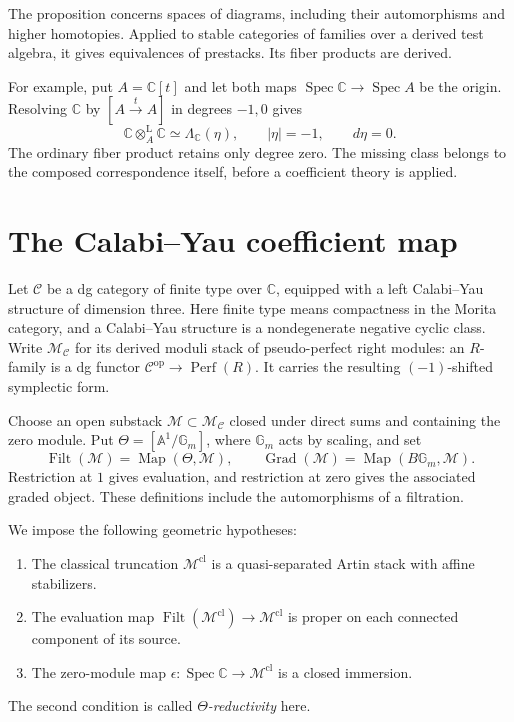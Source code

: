 The proposition concerns spaces of diagrams, including their
automorphisms and higher homotopies. Applied to stable categories
of families over a derived test algebra, it gives equivalences
of prestacks. Its fiber products are derived.

For example, put $A=\mathbb C[t]$ and let both maps
$\operatorname{Spec}\mathbb C\to\operatorname{Spec}A$ be the origin.
Resolving $\mathbb C$ by
$[A\xrightarrow{t}A]$ in degrees $-1,0$ gives
\begin{equation}\label{cyhall:eq:self-intersection}
 \mathbb C\otimes_A^{\mathrm L}\mathbb C
       \simeq\Lambda_{\mathbb C}(\eta),
       \qquad |\eta|=-1,\qquad d\eta=0.
\end{equation}
The ordinary fiber product retains only degree zero.
The missing class belongs to the composed correspondence itself,
before a coefficient theory is applied.

\section{The Calabi--Yau coefficient map}
\label{cyhall:sec:coefficients}

Let $\mathcal C$ be a dg category of finite type over $\mathbb C$,
equipped with a left Calabi--Yau structure of dimension three.
Here finite type means compactness in the Morita category, and
a Calabi--Yau structure is a nondegenerate negative cyclic class.
Write $\mathcal M_{\mathcal C}$ for its derived moduli stack of
pseudo-perfect right modules: an $R$-family is a dg functor
$\mathcal C^{\mathrm{op}}\to\operatorname{Perf}(R)$.
It carries the resulting $(-1)$-shifted symplectic form.

Choose an open substack $\mathcal M\subset\mathcal M_{\mathcal C}$
closed under direct sums and containing the zero module.
Put $\Theta=[\mathbb A^1/\mathbb G_m]$, where
$\mathbb G_m$ acts by scaling, and set
\[
 \operatorname{Filt}(\mathcal M)=\operatorname{Map}(\Theta,\mathcal M),
 \qquad
 \operatorname{Grad}(\mathcal M)=\operatorname{Map}(B\mathbb G_m,\mathcal M).
\]
Restriction at $1$ gives evaluation, and restriction at zero gives
the associated graded object.
These definitions include the automorphisms of a filtration.

We impose the following geometric hypotheses:
\begin{enumerate}
 \item The classical truncation $\mathcal M^{\mathrm{cl}}$ is a
 quasi-separated Artin stack with affine stabilizers.
 \item The evaluation map
 $\operatorname{Filt}(\mathcal M^{\mathrm{cl}})\to
 \mathcal M^{\mathrm{cl}}$ is proper on each connected component
 of its source.
 \item The zero-module map
 $\epsilon:\operatorname{Spec}\mathbb C\to\mathcal M^{\mathrm{cl}}$
 is a closed immersion.
\end{enumerate}
The second condition is called \emph{$\Theta$-reductivity} here.

